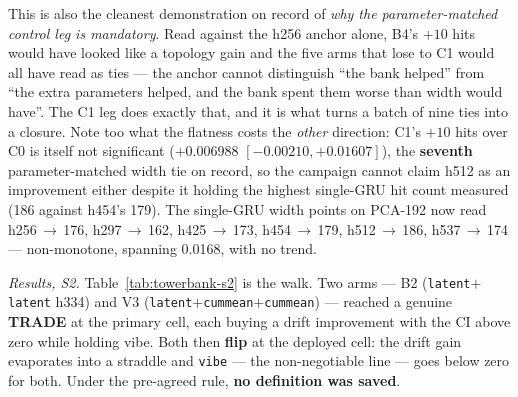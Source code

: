 \documentclass[11pt]{article}
\begin{document}
This is also the cleanest demonstration on record of \emph{why the
parameter-matched control leg is mandatory}. Read against the h256 anchor alone,
B4's $+\num{10}$ hits would have looked like a topology gain and the five arms
that lose to C1 would all have read as ties --- the anchor cannot distinguish
``the bank helped'' from ``the extra parameters helped, and the bank spent them
worse than width would have''. The C1 leg does exactly that, and it is what turns
a batch of nine ties into a closure. Note too what the flatness costs the
\emph{other} direction: C1's $+\num{10}$ hits over C0 is itself not significant
($+\num{0.006988}$ $[-\num{0.00210},+\num{0.01607}]$), the \textbf{seventh}
parameter-matched width tie on record, so the campaign cannot claim h512 as an
improvement either despite it holding the highest single-GRU hit count measured
(\num{186} against h454's \num{179}). The single-GRU width points on PCA-192 now
read h256\,$\to$\,\num{176}, h297\,$\to$\,\num{162}, h425\,$\to$\,\num{173},
h454\,$\to$\,\num{179}, h512\,$\to$\,\num{186}, h537\,$\to$\,\num{174} ---
non-monotone, spanning \num{0.0168}, with no trend.

\emph{Results, S2.} Table~\ref{tab:towerbank-s2} is the walk. Two arms --- B2
(\texttt{latent}$+$\texttt{latent} h334) and V3
(\texttt{latent}$+$\texttt{cummean}$+$\texttt{cummean}) --- reached a genuine
\textbf{TRADE} at the primary cell, each buying a drift improvement with the CI
above zero while holding vibe. Both then \textbf{flip} at the deployed cell: the
drift gain evaporates into a straddle and \texttt{vibe} --- the non-negotiable
line --- goes below zero for both. Under the pre-agreed rule, \textbf{no
definition was saved}.
\end{document}
